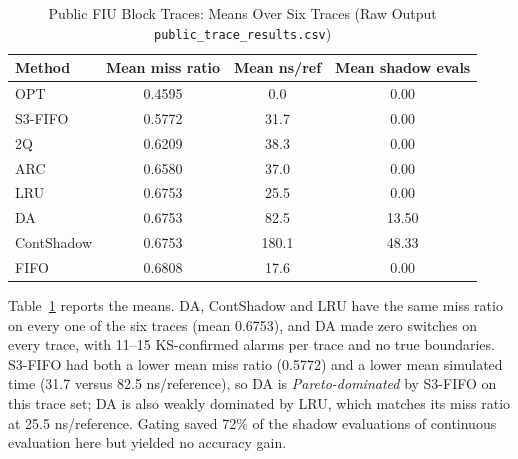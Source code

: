 \documentclass[10pt,twocolumn,a4paper]{IEEEtran}
\begin{document}
\begin{table}[!t]
\caption{Public FIU Block Traces: Means Over Six Traces (Raw Output
\texttt{public\_trace\_results.csv})}
\label{tab:public}
\footnotesize
\setlength{\tabcolsep}{4pt}
\begin{tabular}{@{}lccc@{}}
\toprule
Method & Mean miss ratio & Mean ns/ref & Mean shadow evals \\
\midrule
OPT & 0.4595 & 0.0 & 0.00 \\
S3-FIFO & 0.5772 & 31.7 & 0.00 \\
2Q & 0.6209 & 38.3 & 0.00 \\
ARC & 0.6580 & 37.0 & 0.00 \\
LRU & 0.6753 & 25.5 & 0.00 \\
DA & 0.6753 & 82.5 & 13.50 \\
ContShadow & 0.6753 & 180.1 & 48.33 \\
FIFO & 0.6808 & 17.6 & 0.00 \\
\bottomrule
\end{tabular}
\end{table}

Table~\ref{tab:public} reports the means. DA, ContShadow and LRU have the same
miss ratio on every one of the six traces (mean 0.6753), and DA made zero
switches on every trace, with 11--15 KS-confirmed alarms per trace and no true
boundaries. S3-FIFO had both a lower mean miss ratio (0.5772) and a lower mean
simulated time (31.7 versus 82.5 ns/reference), so DA is \emph{Pareto-dominated}
by S3-FIFO on this trace set; DA is also weakly dominated by LRU, which matches
its miss ratio at 25.5 ns/reference. Gating saved 72\% of the shadow
evaluations of continuous evaluation here but yielded no accuracy gain.
\end{document}
